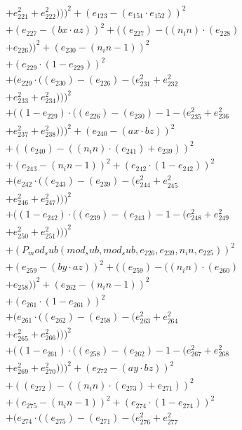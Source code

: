\documentclass[10pt, a4paper]{article}
\begin{document}
\begin{small}
\begin{align*}
& + e_{221}^{2} + e_{222}^{2})))^{2} + (e_{123} - (e_{151}  \cdot  e_{152}))^{2} \\
& + (e_{227} - (bx  \cdot  az))^{2} + ((e_{227}) - ((n_in)  \cdot  (e_{228}) \\
& + e_{226}))^{2} + (e_{230} - (n_in - 1))^{2} \\
& + (e_{229}  \cdot  (1 - e_{229}))^{2} \\
& + (e_{229}  \cdot  ((e_{230}) - (e_{226}) - (e_{231}^{2} + e_{232}^{2} \\
& + e_{233}^{2} + e_{234}^{2})))^{2} \\
& + ((1 - e_{229})  \cdot  ((e_{226}) - (e_{230}) - 1 - (e_{235}^{2} + e_{236}^{2} \\
& + e_{237}^{2} + e_{238}^{2})))^{2} + (e_{240} - (ax  \cdot  bz))^{2} \\
& + ((e_{240}) - ((n_in)  \cdot  (e_{241}) + e_{239}))^{2} \\
& + (e_{243} - (n_in - 1))^{2} + (e_{242}  \cdot  (1 - e_{242}))^{2} \\
& + (e_{242}  \cdot  ((e_{243}) - (e_{239}) - (e_{244}^{2} + e_{245}^{2} \\
& + e_{246}^{2} + e_{247}^{2})))^{2} \\
& + ((1 - e_{242})  \cdot  ((e_{239}) - (e_{243}) - 1 - (e_{248}^{2} + e_{249}^{2} \\
& + e_{250}^{2} + e_{251}^{2})))^{2} \\
& + (P_mod_sub(mod_sub, mod_sub, e_{226}, e_{239}, n_in, e_{225}))^{2} \\
& + (e_{259} - (by  \cdot  az))^{2} + ((e_{259}) - ((n_in)  \cdot  (e_{260}) \\
& + e_{258}))^{2} + (e_{262} - (n_in - 1))^{2} \\
& + (e_{261}  \cdot  (1 - e_{261}))^{2} \\
& + (e_{261}  \cdot  ((e_{262}) - (e_{258}) - (e_{263}^{2} + e_{264}^{2} \\
& + e_{265}^{2} + e_{266}^{2})))^{2} \\
& + ((1 - e_{261})  \cdot  ((e_{258}) - (e_{262}) - 1 - (e_{267}^{2} + e_{268}^{2} \\
& + e_{269}^{2} + e_{270}^{2})))^{2} + (e_{272} - (ay  \cdot  bz))^{2} \\
& + ((e_{272}) - ((n_in)  \cdot  (e_{273}) + e_{271}))^{2} \\
& + (e_{275} - (n_in - 1))^{2} + (e_{274}  \cdot  (1 - e_{274}))^{2} \\
& + (e_{274}  \cdot  ((e_{275}) - (e_{271}) - (e_{276}^{2} + e_{277}^{2} \\

\end{align*}
\end{small}
\end{document}
